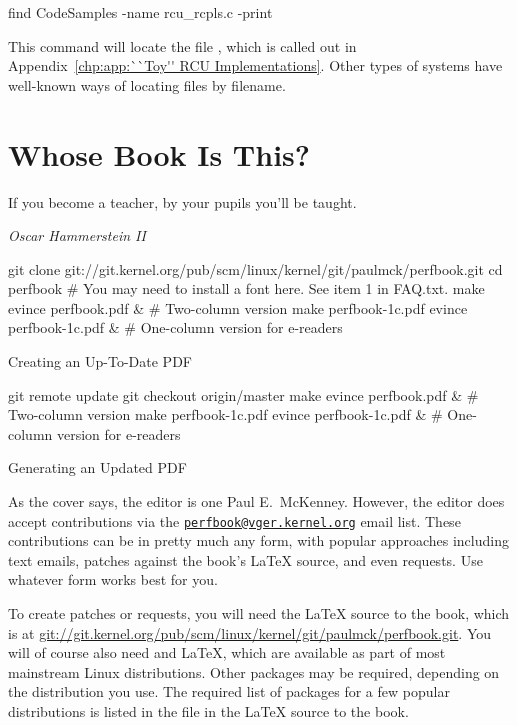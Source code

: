 \begin{VerbatimU}
find CodeSamples -name rcu_rcpls.c -print
\end{VerbatimU}

This command will locate the file , which is called out in
Appendix~\ref{chp:app:``Toy'' RCU Implementations}.
Other types of systems have well-known ways of locating files by filename.

\section{Whose Book Is This?}
\label{sec:howto:Whose Book Is This?}
%
\epigraph{If you become a teacher, by your pupils you'll be taught.}
	 {\emph{Oscar Hammerstein II}}

\begin{listing*}[tbp]
\begin{VerbatimL}
git clone git://git.kernel.org/pub/scm/linux/kernel/git/paulmck/perfbook.git
cd perfbook
# You may need to install a font here. See item 1 in FAQ.txt.
make
evince perfbook.pdf & # Two-column version
make perfbook-1c.pdf
evince perfbook-1c.pdf & # One-column version for e-readers
\end{VerbatimL}
\caption{Creating an Up-To-Date PDF}
\label{lst:howto:Creating a Up-To-Date PDF}
\end{listing*}

\begin{listing*}[tbp]
\begin{VerbatimL}
git remote update
git checkout origin/master
make
evince perfbook.pdf & # Two-column version
make perfbook-1c.pdf
evince perfbook-1c.pdf & # One-column version for e-readers
\end{VerbatimL}
\caption{Generating an Updated PDF}
\label{lst:howto:Generating an Updated PDF}
\end{listing*}

As the cover says, the editor is one Paul E.~McKenney.
However, the editor does accept contributions via the
\href{mailto:perfbook@vger.kernel.org}
{\nolinkurl{perfbook@vger.kernel.org}} email list.
These contributions can be in pretty much any form, with popular
approaches including text emails,
patches against the book's \LaTeX{} source, and even  requests.
Use whatever form works best for you.

To create patches or  requests, you will need the
\LaTeX{} source to the book, which is at
\url{git://git.kernel.org/pub/scm/linux/kernel/git/paulmck/perfbook.git}.
You will of course also need  and \LaTeX{}, which are
available as part of most mainstream Linux distributions.
Other packages may be required, depending on the distribution you use.
The required list of packages for a few popular distributions is listed
in the file  in the \LaTeX{} source to the book.


